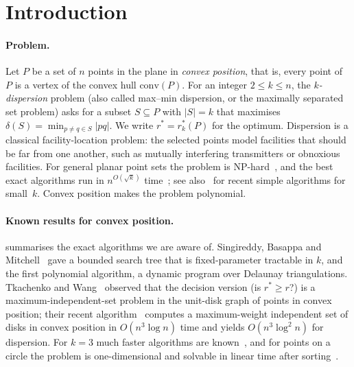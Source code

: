 \documentclass[11pt,a4paper]{article}
\theoremstyle{definition}
\theoremstyle{remark}
\newcommand{\conv}{\mathrm{conv}}
\newcommand{\rstar}{r^{*}}
\begin{document}
\section{Introduction}\label{sec:intro}

\paragraph{Problem.}
Let $P$ be a set of $n$ points in the plane in \emph{convex position}, that
is, every point of $P$ is a vertex of the convex hull $\conv(P)$. For an
integer $2\le k\le n$, the \emph{$k$-dispersion} problem (also called max--min
dispersion, or the maximally separated set problem) asks for a subset
$S\subseteq P$ with $|S|=k$ that maximises
$\delta(S)=\min_{p\ne q\in S}|pq|$. We write $\rstar=\rstar_k(P)$ for the
optimum. Dispersion is a classical facility-location problem: the selected
points model facilities that should be far from one another, such as mutually
interfering transmitters or obnoxious facilities. For general planar point sets
the problem is NP-hard~\cite{wangkuo}, and the best exact algorithms run in
$n^{O(\sqrt k)}$ time~\cite{akagi}; see also~\cite{chendumitrescu} for recent
simple algorithms for small~$k$. Convex position makes the problem polynomial.


\paragraph{Known results for convex position.}
 summarises the exact algorithms we are aware of.
Singireddy, Basappa and Mitchell~\cite{sbm} gave a bounded search tree that
is fixed-parameter tractable in $k$, and the first polynomial algorithm, a
dynamic program over Delaunay triangulations. Tkachenko and
Wang~\cite{tw25} observed that the decision version (is $\rstar\ge r$?) is a
maximum-independent-set problem in the unit-disk graph of points in convex
position; their recent algorithm~\cite{tw26} computes a maximum-weight
independent set of disks in convex position in $O(n^3\log n)$ time and yields
$O(n^3\log^2 n)$ for dispersion. For $k=3$ much faster algorithms are
known~\cite{kobayashi,tw25}, and for points on a circle the problem is
one-dimensional and solvable in linear time after sorting~\cite{akagi}.
\end{document}
